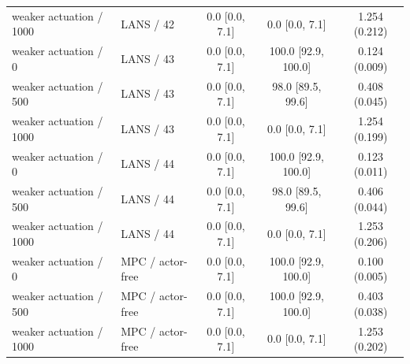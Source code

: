 \begin{longtable}{llccc}
weaker actuation / 1000 & LANS / 42 & 0.0 [0.0, 7.1] & 0.0 [0.0, 7.1] & 1.254 (0.212) \\
weaker actuation / 0 & LANS / 43 & 0.0 [0.0, 7.1] & 100.0 [92.9, 100.0] & 0.124 (0.009) \\
weaker actuation / 500 & LANS / 43 & 0.0 [0.0, 7.1] & 98.0 [89.5, 99.6] & 0.408 (0.045) \\
weaker actuation / 1000 & LANS / 43 & 0.0 [0.0, 7.1] & 0.0 [0.0, 7.1] & 1.254 (0.199) \\
weaker actuation / 0 & LANS / 44 & 0.0 [0.0, 7.1] & 100.0 [92.9, 100.0] & 0.123 (0.011) \\
weaker actuation / 500 & LANS / 44 & 0.0 [0.0, 7.1] & 98.0 [89.5, 99.6] & 0.406 (0.044) \\
weaker actuation / 1000 & LANS / 44 & 0.0 [0.0, 7.1] & 0.0 [0.0, 7.1] & 1.253 (0.206) \\
weaker actuation / 0 & MPC / actor-free & 0.0 [0.0, 7.1] & 100.0 [92.9, 100.0] & 0.100 (0.005) \\
weaker actuation / 500 & MPC / actor-free & 0.0 [0.0, 7.1] & 100.0 [92.9, 100.0] & 0.403 (0.038) \\
weaker actuation / 1000 & MPC / actor-free & 0.0 [0.0, 7.1] & 0.0 [0.0, 7.1] & 1.253 (0.202) \\
\bottomrule
\end{longtable}
